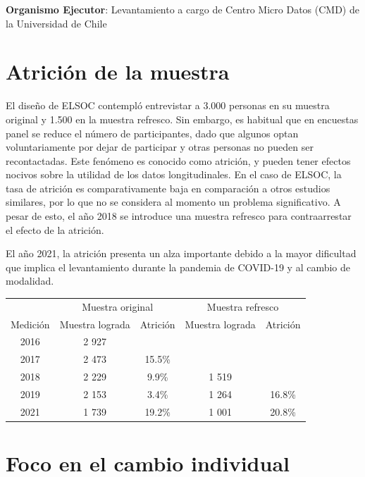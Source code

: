 \documentclass[
  12pt,
]{book}
\begin{document}
\textbf{Organismo Ejecutor}: Levantamiento a cargo de Centro Micro Datos (CMD) de la Universidad de Chile

\hypertarget{atriciuxf3n-de-la-muestra}{%
\chapter{Atrición de la muestra}\label{atriciuxf3n-de-la-muestra}}

El diseño de ELSOC contempló entrevistar a 3.000 personas en su muestra original y 1.500 en la muestra refresco. Sin embargo, es habitual que en encuestas panel se reduce el número de participantes, dado que algunos optan voluntariamente por dejar de participar y otras personas no pueden ser recontactadas. Este fenómeno es conocido como atrición, y pueden tener efectos nocivos sobre la utilidad de los datos longitudinales. En el caso de ELSOC, la tasa de atrición es comparativamente baja en comparación a otros estudios similares, por lo que no se considera al momento un problema significativo. A pesar de esto, el año 2018 se introduce una muestra refresco para contraarrestar el efecto de la atrición.

El año 2021, la atrición presenta un alza importante debido a la mayor dificultad que implica el levantamiento durante la pandemia de COVID-19 y al cambio de modalidad.

\begin{table}[H]
\centering\begin{table}[H]
\centering
\begin{tabular}[t]{c|c|c|c|c}
\hline
\multicolumn{1}{c|}{ } & \multicolumn{2}{c|}{Muestra original} & \multicolumn{2}{c}{Muestra refresco} \\
\cline{2-3} \cline{4-5}
Medición & Muestra lograda & Atrición & Muestra lograda & Atrición\\
\hline
2016 & 2 927 &  &  & \\
\hline
2017 & 2 473 & 15.5\% &  & \\
\hline
2018 & 2 229 & 9.9\% & 1 519 & \\
\hline
2019 & 2 153 & 3.4\% & 1 264 & 16.8\%\\
\hline
2021 & 1 739 & 19.2\% & 1 001 & 20.8\%\\
\hline
\end{tabular}
\end{table}
\end{table}

\hypertarget{foco-en-el-cambio-individual}{%
\chapter{Foco en el cambio individual}\label{foco-en-el-cambio-individual}}
\end{document}
